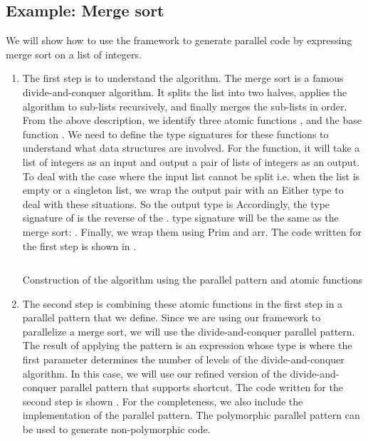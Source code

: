 \subsection{Example: Merge sort}

We will show how to use the framework to generate parallel code by expressing merge sort on a list of integers.

\begin{enumerate}
\begin{listing}[ht]
\begin{verbatim}
split :: SArrow [Int] (Either (Either () Int) ([Int], [Int]))
split = arr $ Prim "split" undefined
    
merge :: SArrow (Either (Either () Int) ([Int], [Int])) [Int]
merge = arr $ Prim "merge" undefined
    
sort :: SArrow [Int] [Int]
sort = arr $ Prim "sort" undefined
\end{verbatim}
\caption{The code for atomic functions}
\label{eval:code:step1}
\end{listing}
    \item The first step is to understand the algorithm. The merge sort is a famous divide-and-conquer algorithm. It splits the list into two halves, applies the algorithm to sub-lists recursively, and finally merges the sub-lists in order. From the above description, we identify three atomic functions ,  and the base function .  We need to define the type signatures for these functions to understand what data structures are involved. For the  function, it will take a list of integers \hask{[Int]} as an input and output a pair of lists of integers  as an output. To deal with the case where the input list cannot be split i.e. when the list is empty or a singleton list, we wrap the output pair with an Either type to deal with these situations. So the output type is  \hask{ ([Int], [Int])} Accordingly, the type signature of  is the reverse of the .  type signature will be the same as the merge sort: \hask{[Int] -> [Int]}. Finally, we wrap them using Prim and arr. The code written for the first step is shown in .
\begin{listing}[ht]
\inputminted{Haskell}{eval/step2.hs}
\caption{Construction of the algorithm using the parallel pattern and atomic functions}
\label{eval:code:step2}
\end{listing}
    \item The second step is combining these atomic functions in the first step in a parallel pattern that we define. Since we are using our framework to parallelize a merge sort, we will use the divide-and-conquer parallel pattern. The result of applying the pattern is an expression whose type is  where the first parameter determines the number of levels of the divide-and-conquer algorithm. In this case, we will use our refined version of the divide-and-conquer parallel pattern that supports shortcut. The code written for the second step is shown . For the completeness, we also include the implementation of the parallel pattern. The polymorphic parallel pattern can be used to generate non-polymorphic code. 

\end{enumerate}
